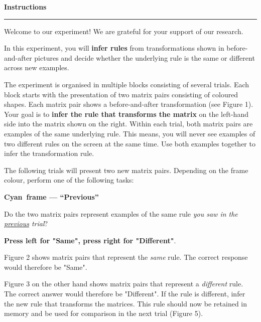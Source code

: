 \documentclass[11pt]{article}
\newcommand{\PrevColorName}{}
\renewcommand{\PrevColorName}{Yellow}
\renewcommand{\PrevColorName}{Cyan}
\begin{document}
{\LARGE\bfseries Instructions}\par
\vspace{4pt}
{\color{accent}\rule{\linewidth}{1pt}}

\vspace{8pt}

Welcome to our experiment! We are grateful for your support of our research.


\vspace{0.4cm}

\begin{overviewbox}
In this experiment, you will \textbf{infer rules} from transformations shown in before-and-after pictures %
and decide whether the underlying rule is the same or different across new examples.
\end{overviewbox}

\vspace{0.4cm}

The experiment is organised in multiple blocks consisting of several trials. Each block starts with the presentation of two matrix pairs consisting of coloured shapes. Each matrix pair shows a before-and-after transformation (see Figure 1). Your goal is to \textbf{infer the rule that transforms the matrix} on the left-hand side into the matrix shown on the right. Within each trial, both matrix pairs are examples of the same underlying rule. This means, you will never see examples of two different rules on the screen at the same time. Use both examples together to infer the transformation rule.

\vspace{0.6cm}

The following trials will present two new matrix pairs. Depending on the frame colour, perform one of the following tasks: 

\vspace{0.2cm}

\begin{prevbox}
\textbf{\PrevColorName\ frame --- ``Previous''}

Do the two matrix pairs represent examples of the same rule \textit{you saw in the \underline{previous} trial}?

\vspace{0.2cm}
{

\centering
\textbf{Press left for "Same", press right for "Different"}.

}

\vspace{0.2cm}


Figure 2 shows matrix pairs that represent the \textit{same} rule. The correct response would therefore be "Same". 

Figure 3 on the other hand shows matrix pairs that represent a \textit{different} rule. The correct answer would therefore be "Different". If the rule is different, infer the new rule that transforms the matrices. This rule should now be retained in memory and be used for comparison in the next trial (Figure 5).

\end{prevbox}
\end{document}
